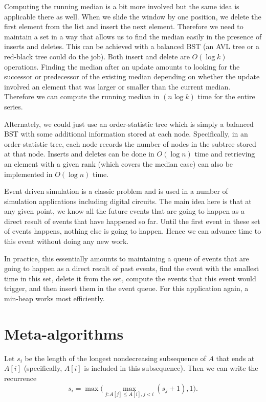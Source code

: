 Computing the running median is a bit more involved but the same idea is applicable there as well. 
When we slide the window by one position, we delete the first element
from the list and insert the next element. 
Therefore we need to maintain a set 
in a way that allows us to find the median easily in the presence of
inserts and deletes.
This can be achieved with a balanced BST (an AVL tree or a red-black tree could do the job). 
Both insert and delete are $O(\log k)$ operations.
Finding the median after an update amounts to looking for the successor or
predecessor
of the existing median depending on whether the update involved an element
that was larger or smaller than the current median.
Therefore we can compute the running median in $(n\log k)$ time for the entire series.

Alternately, we could just use an order-statistic tree which is simply a balanced BST with
some additional information stored at each node.  Specifically, in an order-statistic
tree, each node records the number of nodes in the subtree stored at that node.
Inserts and deletes can be done in $O(\log n)$ time and retrieving
an element with a given rank (which covers the median case)
can also be implemented in $O(\log n)$ time.



Event driven simulation is a classic problem and is used in a number
of simulation applications including digital circuits. The main idea
here is that at any given point, we know all the future events that are
going to happen as a direct result of events that have happened so
far. Until the first event in these set of events happens, nothing
else is going to happen. Hence we can advance time to this event
without doing any new work. 

In practice, this essentially amounts to maintaining a queue of events
that are going to happen as a direct result of past events, find the
event with the smallest time in this set, delete it from the set,
compute the events that this event would trigger, and then insert them
in the event queue. For this application again, a min-heap works
most efficiently. 


\chapter{ Meta-algorithms}\normalsize

Let $s_i$ be the length of the longest nondecreasing subsequence of $A$ that ends
at $A[i]$ (specifically, $A[i]$ is included in this subsequence). Then 
we can write the recurrence
\[ 
s_i = \max\Big( \max_{j: A[j] \leq A[i], j < i} (s_j +1) , 1 \Big) .
\]

